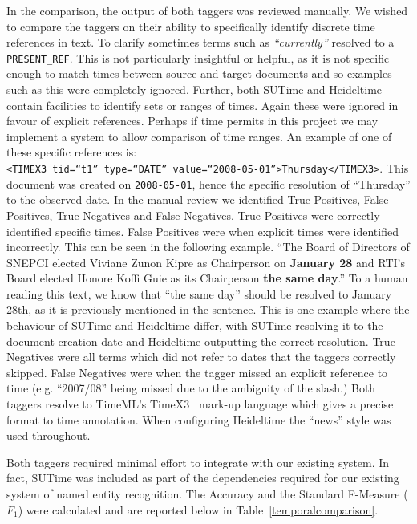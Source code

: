 \documentclass{mprop}
\newcommand{\code}[1]{\texttt{#1}}
\let\oldcite=\cite
\renewcommand\cite[1]{\ifthenelse{\equal{#1}{NEEDED}}{\ensuremath{^\texttt{[citation~needed]}}}{\oldcite{#1}}}
\begin{document}
In the comparison, the output of both taggers was reviewed manually. We wished to compare the taggers on their ability to specifically identify discrete time references in text. 
To clarify sometimes terms such as \textit{``currently''} resolved to a \code{PRESENT\_REF}. 
This is not particularly insightful or helpful, as it is not specific enough to match times between source and target documents and so examples such as this were completely ignored. 
Further, both SUTime and Heideltime contain facilities to identify sets or ranges of times. 
Again these were ignored in favour of explicit references.
Perhaps if time permits in this project we may implement a system to allow comparison of time ranges. 
An example of one of these specific references is: 
\\ \code{<TIMEX3 tid=``t1'' type=``DATE'' value=``2008-05-01''>Thursday</TIMEX3>}.
This document was created on \code{2008-05-01}, hence the specific resolution of ``Thursday'' to the observed date.
In the manual review we identified True Positives, False Positives, True Negatives and False Negatives. True Positives were correctly identified specific times. False Positives were when explicit times were identified incorrectly. This can be seen in the following example. ``The Board of Directors of SNEPCI elected Viviane Zunon Kipre as Chairperson on \textbf{January 28} and RTI's Board elected Honore Koffi Guie as its Chairperson \textbf{the same day}.'' To a human reading this text, we know that ``the same day'' should be resolved to January 28th, as it is previously mentioned in the sentence. This is one example where the behaviour of SUTime and Heideltime differ, with SUTime resolving it to the document creation date and Heideltime outputting the correct resolution. True Negatives were all terms which did not refer to dates that the taggers correctly skipped. False Negatives were when the tagger missed an explicit reference to time (e.g. ``2007/08'' being missed due to the ambiguity of the slash.)
Both taggers resolve to TimeML's TimeX3~\cite{timeml} mark-up language which gives a precise format to time annotation.
When configuring Heideltime the ``news'' style was used throughout.

Both taggers required minimal effort to integrate with our existing system. In fact, SUTime was included as part of the dependencies required for our existing system of named entity recognition. The Accuracy and the Standard F-Measure (\textbf{$ F_1 $}) were calculated and are reported below in Table~\ref{temporalcomparison}.
\end{document}

